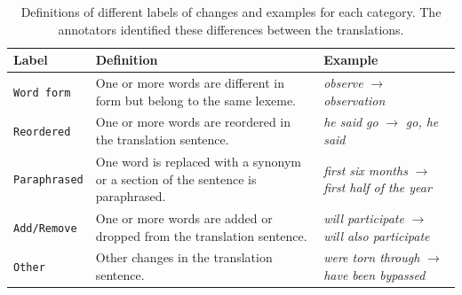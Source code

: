  \begin{table}[htb!]
\centering \small
\caption{Definitions of different labels of changes and examples for each category. The annotators identified these differences between the translations. \label{guidelinestab} }
\begin{tabularx}{0.95\columnwidth}{lXX}
\bf Label & \bf Definition & \bf Example  \\ \toprule
\texttt{Word form} & One or more words are different in form but belong to the same lexeme.   & \textit{observe} $\rightarrow$ \textit{observation} \\
\texttt{Reordered} & One or more words are reordered in the translation sentence.   & \textit{he said go}  $\rightarrow$ \textit{go, he said} \\
\texttt{Paraphrased} & One word is replaced with a synonym or a section of the sentence is paraphrased. & \textit{first six months} $\rightarrow$ \textit{first half of the year} \\
\texttt{Add/Remove} & One or more words are added or dropped from the translation sentence. & \textit{will participate} $\rightarrow$  \textit{will also participate}   \\
\texttt{Other}  & Other changes in the translation sentence.  & \textit{were torn through} $\rightarrow$  \textit{have been bypassed}   \\
\end{tabularx}
\end{table}
%
